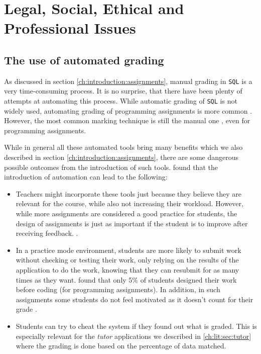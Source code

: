\chapter{Legal, Social, Ethical and Professional Issues}

\section{The use of automated grading}

As discussed in section \ref{ch:introduction:assignments}, manual grading in \texttt{SQL} is a very time-consuming process. It is no surprise, that there have been plenty of attempts at automating this process. While automatic grading of \texttt{SQL} is not widely used, automating grading of programming assignments is more common \citep{literature:assesment:automated:survey}. However, the most common marking technique is still the manual one \citep{literature:assesment:automated:survey}, even for programming assignments.

While in general all these automated tools bring many benefits which we also described in section \ref{ch:introduction:assignments}, there are some dangerous possible outcomes from the introduction of such tools. \cite{literature:assesment:automated:survey} found that the introduction of automation can lead to the following:
\begin{itemize}
    \item Teachers might incorporate these tools just because they believe they are relevant for the course, while also not increasing their workload. However, while more assignments are considered a good practice for students, the design of assignments is just as important if the student is to improve after receiving feedback. \citep{literature:assesment:automated:survey, literature:assement}.
    \item In a practice mode environment, students are more likely to submit work without checking or testing their work, only relying on the results of the application to do the work, knowing that they can resubmit for as many times as they want. \cite{literature:assesment:automated:survey} found that only 5\% of students designed their work before coding (for programming assignments). In addition, in such assignments some students do not feel motivated as it doesn't count for their grade \citep{literature:activesql}.
    \item Students can try to cheat the system if they found out what is graded. This is especially relevant for the \textit{tutor} applications we described in \ref{ch:lit:sec:tutor} where the grading is done based on the percentage of data matched.
\end{itemize}

